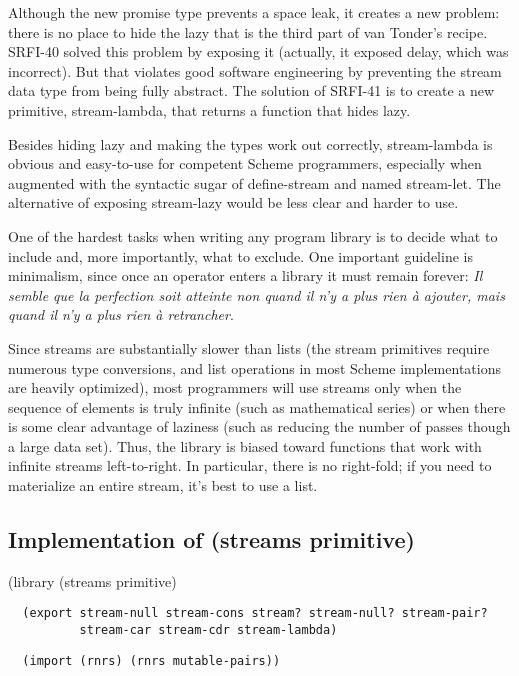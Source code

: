 Although the new promise type prevents a space leak, it creates a new
problem: there is no place to hide the lazy that is the third part of
van Tonder's recipe. SRFI-40 solved this problem by exposing it
(actually, it exposed delay, which was incorrect). But that violates
good software engineering by preventing the stream data type from being
fully abstract. The solution of SRFI-41 is to create a new primitive,
stream-lambda, that returns a function that hides lazy.

Besides hiding lazy and making the types work out correctly,
stream-lambda is obvious and easy-to-use for competent Scheme
programmers, especially when augmented with the syntactic sugar of
define-stream and named stream-let. The alternative of exposing
stream-lazy would be less clear and harder to use.

One of the hardest tasks when writing any program library is to decide
what to include and, more importantly, what to exclude. One important
guideline is minimalism, since once an operator enters a library it must
remain forever: \emph{Il semble que la perfection soit atteinte non
quand il n'y a plus rien à ajouter, mais quand il n'y a plus rien à
retrancher}.

Since streams are substantially slower than lists (the stream primitives
require numerous type conversions, and list operations in most Scheme
implementations are heavily optimized), most programmers will use
streams only when the sequence of elements is truly infinite (such as
mathematical series) or when there is some clear advantage of laziness
(such as reducing the number of passes though a large data set). Thus,
the library is biased toward functions that work with infinite streams
left-to-right. In particular, there is no right-fold; if you need to
materialize an entire stream, it's best to use a list.

\subsection{Implementation of (streams
primitive)}\label{implementation-of-streams-primitive}

(library (streams primitive)

\begin{verbatim}
  (export stream-null stream-cons stream? stream-null? stream-pair?
          stream-car stream-cdr stream-lambda)
\end{verbatim}

\begin{verbatim}
  (import (rnrs) (rnrs mutable-pairs))
\end{verbatim}

